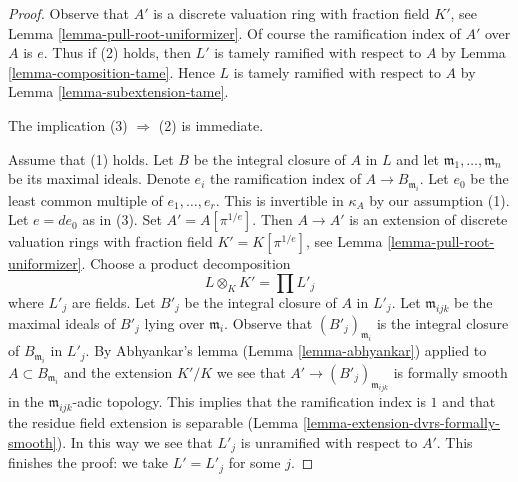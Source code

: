 \documentclass[10pt,a4paper]{amsart}
\theoremstyle{plain}
\theoremstyle{definition}
\theoremstyle{remark}
\numberwithin{equation}{subsection}
\begin{document}
\begin{proof}
Observe that $A'$ is a discrete valuation ring with fraction
field $K'$, see Lemma \ref{lemma-pull-root-uniformizer}.
Of course the ramification index of $A'$ over $A$ is $e$.
Thus if (2) holds, then $L'$ is tamely ramified with respect to $A$
by Lemma \ref{lemma-composition-tame}. Hence $L$ is tamely
ramified with respect to $A$ by Lemma \ref{lemma-subextension-tame}.

\medskip\noindent
The implication (3) $\Rightarrow$ (2) is immediate.

\medskip\noindent
Assume that (1) holds. Let $B$ be the integral closure of $A$ in $L$
and let $\mathfrak m_1, \ldots, \mathfrak m_n$ be its maximal ideals.
Denote $e_i$ the ramification index of $A \to B_{\mathfrak m_i}$.
Let $e_0$ be the least common multiple of $e_1, \ldots, e_r$.
This is invertible in $\kappa_A$ by our assumption (1).
Let $e = de_0$ as in (3). Set $A' = A[\pi^{1/e}]$.
Then $A \to A'$ is an extension of discrete valuation rings
with fraction field $K' = K[\pi^{1/e}]$, see
Lemma \ref{lemma-pull-root-uniformizer}.
Choose a product decomposition
$$
L \otimes_K K' = \prod L'_j
$$
where $L'_j$ are fields. Let $B'_j$ be the integral closure
of $A$ in $L'_j$. Let $\mathfrak m_{ijk}$ be the maximal
ideals of $B'_j$ lying over $\mathfrak m_i$.
Observe that $(B'_j)_{\mathfrak m_i}$ is the integral
closure of $B_{\mathfrak m_i}$ in $L'_j$.
By Abhyankar's lemma (Lemma \ref{lemma-abhyankar})
applied to $A \subset B_{\mathfrak m_i}$ and the extension $K'/K$
we see that $A' \to (B'_j)_{\mathfrak m_{ijk}}$
is formally smooth in the $\mathfrak m_{ijk}$-adic topology.
This implies that the ramification index is $1$ and
that the residue field extension is separable
(Lemma \ref{lemma-extension-dvrs-formally-smooth}).
In this way we see that $L'_j$ is unramified with respect to $A'$.
This finishes the proof: we take $L' = L'_j$ for some $j$.
\end{proof}
\end{document}

